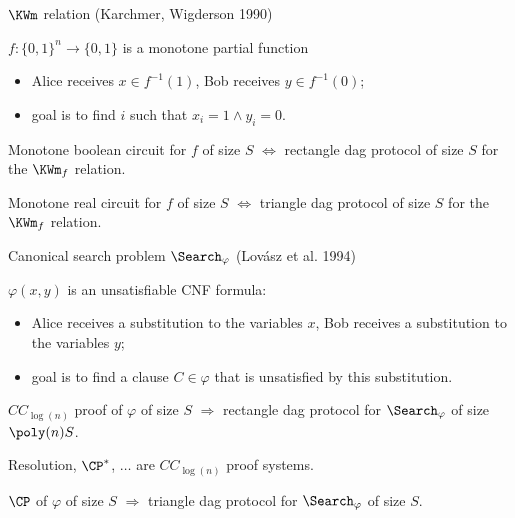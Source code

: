 \begin{frame}{$\KWm$ relation (Karchmer, Wigderson 1990)}

    $f:\{0, 1\}^n \to \{0, 1\}$ is a monotone partial function
    
    \begin{itemize}
        \item Alice receives $x \in f^{-1}(1)$, Bob receives $y \in f^{-1}(0)$;
        \item goal is to find $i$ such that $x_i = 1 \land y_i = 0$.
    \end{itemize}

    \pause

    \begin{theorem}
        Monotone boolean circuit for $f$ of size $S$ $\Leftrightarrow$ rectangle dag protocol of size $S$
        for the $\KWm_f$ relation.
    \end{theorem}

    \pause

    \begin{theorem}
        Monotone real circuit for $f$ of size $S$ $\Leftrightarrow$ triangle dag protocol of size $S$
        for the $\KWm_f$ relation.
    \end{theorem}
\end{frame}


\begin{frame}{Canonical search problem $\Search_{\varphi}$ (Lov{\'{a}}sz et al. 1994)}
    
    $\varphi(x, y)$ is an unsatisfiable CNF formula:
    \begin{itemize}
        \item Alice receives a substitution to the variables $x$, Bob receives a substitution to the
            variables $y$;
        \item goal is to find a clause $C \in \varphi$ that is unsatisfied by this substitution.
    \end{itemize}

    \pause

    \begin{theorem}[Kraj{\'{\i}}{\v{c}}ek 95; S 17]
        $CC_{\log(n)}$ proof of $\varphi$ of size $S$ $\Rightarrow$ rectangle dag protocol for
        $\Search_{\varphi}$ of size $\poly(n) S$.
    \end{theorem}

    Resolution, $\CP^*$, $\dots$ are $CC_{\log(n)}$ proof systems.

    \pause
    
    \begin{theorem}[S 17]
        $\CP$ of $\varphi$ of size $S$ $\Rightarrow$ triangle dag protocol for $\Search_{\varphi}$ of
        size $S$.
    \end{theorem}
\end{frame}
